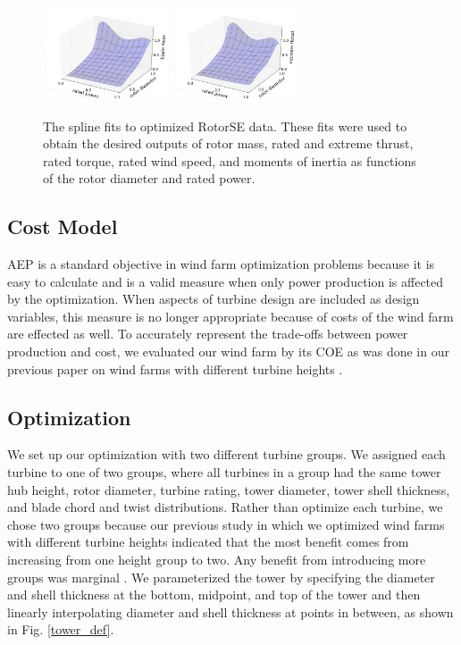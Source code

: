 \documentclass[WESD, manuscript]{copernicus}
\begin{document}
\begin{figure}[htbp]
 \includegraphics[trim={2cm 0 0 0},clip,width=0.33\textwidth]{Figures/blade_mass.pdf}\label{blade_mass}
 \includegraphics[trim={2cm 0 0 0},clip,width=0.33\textwidth]{Figures/extreme_thrust.pdf}\label{extreme_thrust}
  \caption{\label{rotor_nacelle} The spline fits to optimized RotorSE data. These fits were used to obtain the desired outputs of rotor mass, rated and extreme thrust, rated torque, rated wind speed, and moments of inertia as functions of the rotor diameter and rated power.}
\end{figure}

	\subsection{Cost Model}
	AEP is a standard objective in wind farm optimization problems because it is easy to calculate and is a valid measure when only power production is affected by the optimization. When aspects of turbine design are included as design variables, this measure is no longer appropriate because of costs of the wind farm are effected as well. To accurately represent the trade-offs between power production and cost, we evaluated our wind farm by its COE as was done in our previous paper on wind farms with different turbine heights \citep{stanley2018}.              

	\subsection{Optimization}
	\label{sec:optimization}
	We set up our optimization with two different turbine groups. We assigned each turbine to one of two groups, where all turbines in a group had the same tower hub height, rotor diameter, turbine rating, tower diameter, tower shell thickness, and blade chord and twist distributions.
Rather than optimize each turbine, we chose two groups because our previous study in which we optimized wind farms with different turbine heights indicated that the most benefit comes from increasing from one height group to two. Any benefit from introducing more groups was marginal \citep{stanley2018}. We parameterized the tower by specifying the diameter and shell thickness at the bottom, midpoint, and top of the tower and then linearly interpolating diameter and shell thickness at points in between, as shown in Fig. \ref{tower_def}.
\end{document}
